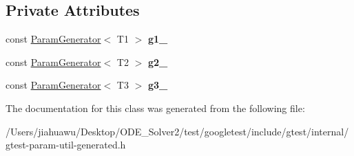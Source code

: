 \subsection*{Private Attributes}
\begin{DoxyCompactItemize}
\item 
\mbox{\label{classtesting_1_1internal_1_1_cartesian_product_generator3_a2c42604631f735285a8ed339e0b1373e}} 
const \mbox{\hyperlink{classtesting_1_1internal_1_1_param_generator}{Param\+Generator}}$<$ T1 $>$ {\bfseries g1\+\_\+}
\item 
\mbox{\label{classtesting_1_1internal_1_1_cartesian_product_generator3_a904aef44febd3230ab9f9f36d0c0b876}} 
const \mbox{\hyperlink{classtesting_1_1internal_1_1_param_generator}{Param\+Generator}}$<$ T2 $>$ {\bfseries g2\+\_\+}
\item 
\mbox{\label{classtesting_1_1internal_1_1_cartesian_product_generator3_ab10481ef2569cea953bdb3b4cac2a5c2}} 
const \mbox{\hyperlink{classtesting_1_1internal_1_1_param_generator}{Param\+Generator}}$<$ T3 $>$ {\bfseries g3\+\_\+}
\end{DoxyCompactItemize}


The documentation for this class was generated from the following file\+:\begin{DoxyCompactItemize}
\item 
/\+Users/jiahuawu/\+Desktop/\+O\+D\+E\+\_\+\+Solver2/test/googletest/include/gtest/internal/gtest-\/param-\/util-\/generated.\+h\end{DoxyCompactItemize}
